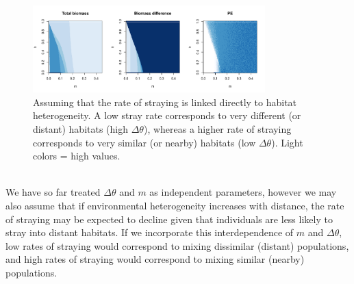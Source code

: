 \documentclass[twocolumn,preprintnumbers,amsmath,amssymb,superscriptaddress]{revtex4}
\begin{document}
% 

\begin{figure}
  \captionsetup{justification=raggedright,
singlelinecheck=false
}
  \centering
  \includegraphics[width=0.8\textwidth]{figs2/fig_MDPE_hm_mtheta.pdf}
  \caption{
  Assuming that the rate of straying is linked directly to habitat heterogeneity. A low stray rate corresponds to very different (or distant) habitats (high $\Delta\theta$), whereas a higher rate of straying corresponds to very similar (or nearby) habitats (low $\Delta\theta$). Light colors = high values.
  } \label{fig:mtheta}
\end{figure}








\\ 
\noindent We have so far treated $\Delta\theta$ and $m$ as independent parameters, however we may also assume that if environmental heterogeneity increases with distance, the rate of straying may be expected to decline given that individuals are less likely to stray into distant habitats. %
If we incorporate this interdependence of $m$ and $\Delta\theta$, low rates of straying would correspond to mixing dissimilar (distant) populations, and high rates of straying would correspond to mixing similar (nearby) populations.
\end{document}
